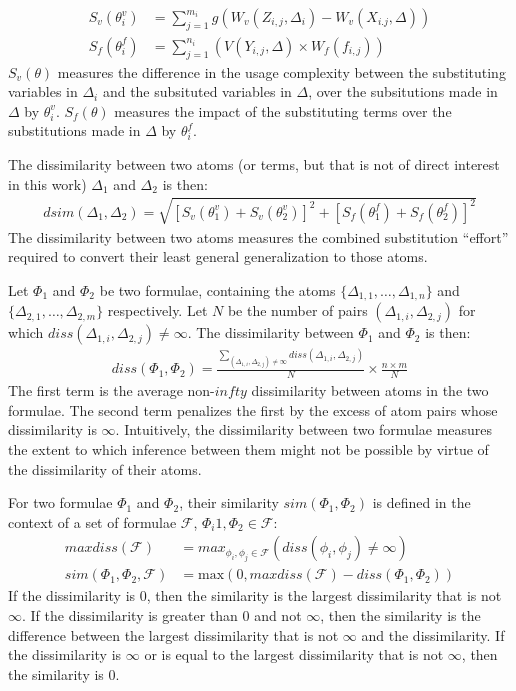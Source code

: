 \documentclass[EPiC]{easychair}
\begin{document}
\begin{align}
S_v(\theta_i^v) &= \sum_{j=1}^{m_i} g(W_v(Z_{i,j},\Delta_i) - W_v(X_{i.j},\Delta)) \\
S_f(\theta_i^f) &= \sum_{j=1}^{n_i} (V(Y_{i,j},\Delta) \times W_f(f_{i,j}))
\end{align}
$S_v(\theta)$ measures the difference in the usage complexity between
the substituting variables in $\Delta_i$ and the subsituted variables 
in $\Delta$, over the subsitutions made in $\Delta$ by $\theta_i^v$.
$S_f(\theta)$ measures the impact of the substituting terms over the 
substitutions made in $\Delta$ by $\theta_i^f$.

The dissimilarity between two atoms (or terms, but that is not of direct
interest in this work) $\Delta_1$ and $\Delta_2$ is then:
\begin{align}
dsim(\Delta_1,\Delta_2) = \sqrt{[S_v(\theta_1^v)+S_v(\theta_2^v)]^2+[S_f(\theta_1^f)+S_f(\theta_2^f)]^2}
\end{align}
The dissimilarity between two atoms measures the combined substitution
``effort'' required to convert their least general generalization to those 
atoms.

Let $\Phi_1$ and $\Phi_2$ be two formulae, containing the atoms
$\{\Delta_{1,1},\dots,\Delta_{1,n}\}$ and 
$\{\Delta_{2,1},\dots,\Delta_{2,m}\}$ respectively.
Let $N$ be the number of pairs $(\Delta_{1,i},\Delta_{2,j})$ for which
$diss(\Delta_{1,i},\Delta_{2,j}) \neq \infty$.
The dissimilarity between $\Phi_1$ and $\Phi_2$ is then:
\begin{align}
diss(\Phi_1,\Phi_2) = 
\frac{\sum_{(\Delta_{1,i},\Delta_{2,j}) \neq \infty}diss(\Delta_{1,i},\Delta_{2,j})}{N}
\times
\frac{n \times m}{N} 
\end{align}
The first term is the average non-$infty$ dissimilarity between atoms in
the two formulae. 
The second term penalizes the first by the excess of atom pairs whose
dissimilarity is $\infty$.
Intuitively, the dissimilarity between two formulae measures the extent 
to which inference between them might not be possible by virtue of the 
dissimilarity of their atoms.

For two formulae $\Phi_1$ and $\Phi_2$, their similarity $sim(\Phi_1,\Phi_2)$
is defined in the context of a set of formulae $\mathcal{F}$, 
$\Phi_i1,\Phi_2 \in \mathcal{F}$:
\begin{align}
maxdiss(\mathcal{F}) &= max_{\phi_i,\phi_j \in \mathcal{F}} (diss(\phi_i,\phi_j) \neq \infty) \\
sim(\Phi_1,\Phi_2,\mathcal{F}) &= \textrm{max}(0, maxdiss(\mathcal{F}) - diss(\Phi_1,\Phi_2))
\end{align}
If the dissimilarity is $0$, then the similarity is the largest dissimilarity 
that is not $\infty$.
If the dissimilarity is greater than $0$ and not $\infty$, then the similarity 
is the difference between the largest dissimilarity that is not $\infty$ and 
the dissimilarity.
If the dissimilarity is $\infty$ or is equal to the largest 
dissimilarity that is not $\infty$, then the similarity is $0$.
\end{document}
